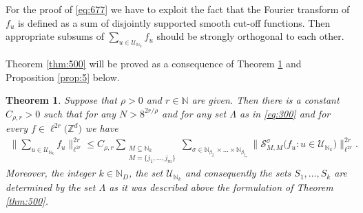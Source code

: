 \documentclass[a4paper,oneside]{amsart}
\theoremstyle{plain}
\newtheorem{theorem}{Theorem}
\theoremstyle{definition}
\numberwithin{equation}{section}
\newcounter{thm}
\theoremstyle{plain}
\newcommand{\ZZ}{\mathbb{Z}}
\newcommand{\NN}{\mathbb{N}}
\renewcommand{\atop}[2]{\substack{{#1}\\{#2}}}
\newcommand{\8}{\infty}
\begin{document}
 For the proof of
\eqref{eq:677} we have to exploit the fact that the Fourier transform
of $f_u$ is defined as a sum of disjointly supported smooth cut-off
functions. Then appropriate subsums of
$\sum_{u\in\mathcal U_{\NN_k}}f_u$ should be strongly orthogonal to
each other. 

Theorem \ref{thm:500} will be proved as a consequence of Theorem
\ref{thm:5} and Proposition \ref{prop:5} below.  

\begin{theorem}
  \label{thm:5}
Suppose that $\rho>0$ and $r\in\NN$ are given. Then there is a
constant $C_{\rho, r}>0$ such that for any $N>8^{2r/\rho}$ and for any
set $\Lambda$ as in \eqref{eq:300}
and for every $f\in\ell^{2r}\big(\ZZ^d\big)$ we have  
\begin{align}
  \label{eq:130}
  \Big\|\sum_{u\in\mathcal U_{\NN_k}}
  f_{u}\Big\|_{\ell^{2r}}^{2r}
\le C_{\rho, r}\sum_{\atop{M\subseteq \NN_k}{M=\{j_1, \ldots,
    j_m\}}}\sum_{\sigma\in\NN_{\beta_{j_1}}\times\ldots\times\NN_{\beta_{j_m}}}
\big\|\mathcal S_{M, M}^{\sigma}\big(f_u:u\in\mathcal
  U_{\NN_k}\big)\big\|_{\ell^{2r}}^{2r}.
\end{align}
Moreover, the integer $k\in\NN_D$, the set $\mathcal U_{\NN_k}$ and consequently  the sets $S_1,\ldots, S_k$
 are determined by the set $\Lambda$ as it was described  above the
 formulation of
 Theorem \ref{thm:500}.
\end{theorem}
\end{document}

